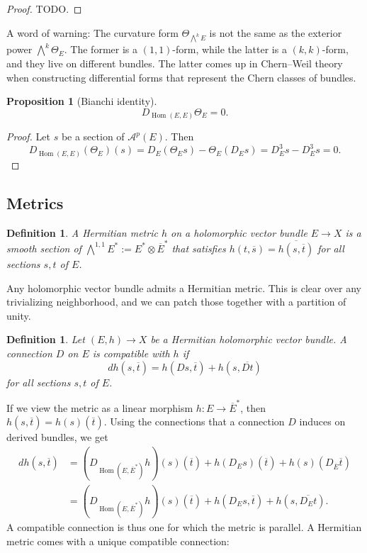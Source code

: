 \documentclass[10pt,a4paper]{article}
\newtheorem{prop}[theo]{Proposition}
\newtheorem{defi}[theo]{Definition}
\newtheorem*{proof}{Proof}
\newcommand{\cc}[1]{\mathcal{#1}}
\def\ov#1{\overline{#1}}
\DeclareMathOperator{\Hom}{Hom}
\begin{document}
\begin{proof}
  TODO.
\end{proof}


A word of warning: The curvature form $\Theta_{\bigwedge^kE}$ is not the same as the exterior power $\bigwedge^k \Theta_E$. The former is a $(1,1)$-form, while the latter is a $(k,k)$-form, and they live on different bundles. The latter comes up in Chern--Weil theory when constructing differential forms that represent the Chern classes of bundles.


\begin{prop}[Bianchi identity]
\[
D_{\Hom(E,E)} \Theta_E = 0.
\]
\end{prop}

\begin{proof}
Let $s$ be a section of $\cc A^p(E)$. Then
\[
D_{\Hom(E,E)}(\Theta_E)(s)
= D_E(\Theta_E s) - \Theta_E(D_E s)
= D_E^3 s - D_E^3 s = 0.
\]
\end{proof}


\subsection{Metrics}

\begin{defi}
A \emph{Hermitian metric} $h$ on a holomorphic vector bundle $E \to X$ is a smooth section of $\bigwedge^{1,1}E^* := E^* \otimes \overline E^*$ that satisfies $h(t,\ov s) = \overline{h(s,\ov t)}$ for all sections $s, t$ of $E$.
\end{defi}

Any holomorphic vector bundle admits a Hermitian metric. This is clear over any trivializing neighborhood, and we can patch those together with a partition of unity.


\begin{defi}
Let $(E, h) \to X$ be a Hermitian holomorphic vector bundle. A connection $D$ on $E$ is \emph{compatible} with $h$ if
$$
d h(s, \ov t)
= h(Ds, \ov t) + h(s,\ov{Dt})
$$
for all sections $s, t$ of $E$.
\end{defi}

If we view the metric as a linear morphism $h : E \to \ov E^*$, then $h(s, \ov t) = h(s)(\ov t)$. Using the connections that a connection $D$ induces on derived bundles, we get
\begin{align*}
d h(s, \ov t)
&= (D_{\Hom(E, \ov E^*)}h)(s)(\ov t)
+ h(D_E s)(\ov t)
+ h(s)(D_{\ov E}\ov{t})
\\
&= (D_{\Hom(E, \ov E^*)}h)(s)(\ov t)
+ h(D_E s, \ov t)
+ h(s, \ov{D_E t}).
\end{align*}
A compatible connection is thus one for which the metric is parallel.
A Hermitian metric comes with a unique compatible connection:
\end{document}
